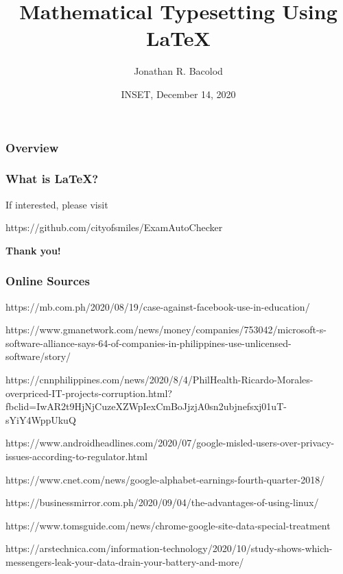 \documentclass[17pt]{beamer}
\title[Math Typesetting Using \LaTeX] {Mathematical Typesetting Using \LaTeX}
\author{Jonathan R. Bacolod}
\institute[SHS]{Sauyo High School}
\date[INSET, Dec. 2020]{INSET, December 14, 2020}
\begin{document}
	\frame{\titlepage}

	\begin{frame}
		\frametitle{Overview}
		\tableofcontents 
	\end{frame}

    \begin{frame}
    	\frametitle{What is \LaTeX?}
    	
    \end{frame}	
	
    \begin{frame}
    	\begin{center}
    		If interested, please visit
    		
    		\vspace*{1em}
    		
    		\footnotesize{https://github.com/cityofsmiles/ExamAutoChecker}
    	\end{center}
    \end{frame}

    \begin{frame}
    	\begin{center}
    		\textbf{\LARGE Thank you!}
    	\end{center}
    \end{frame}

	\begin{frame}
		\frametitle{Online Sources}
		\tiny 
		https://mb.com.ph/2020/08/19/case-against-facebook-use-in-education/
\newline
		
		https://www.gmanetwork.com/news/money/companies/753042/microsoft-s-software-alliance-says-64-of-companies-in-philippines-use-unlicensed-software/story/
\newline
		
		https://cnnphilippines.com/news/2020/8/4/PhilHealth-Ricardo-Morales-overpriced-IT-projects-corruption.html?fbclid=IwAR2t9HjNjCuzeXZWpIexCmBoJjzjA0sn2ubjnefsxj01uT-sYiY4WppUkuQ
\newline
		
		https://www.androidheadlines.com/2020/07/google-misled-users-over-privacy-issues-according-to-regulator.html
\newline
		
		https://www.cnet.com/news/google-alphabet-earnings-fourth-quarter-2018/
\newline
		
		https://businessmirror.com.ph/2020/09/04/the-advantages-of-using-linux/
\newline


    https://www.tomsguide.com/news/chrome-google-site-data-special-treatment \newline

    https://arstechnica.com/information-technology/2020/10/study-shows-which-messengers-leak-your-data-drain-your-battery-and-more/
		
	\end{frame}	
	
\end{document}
